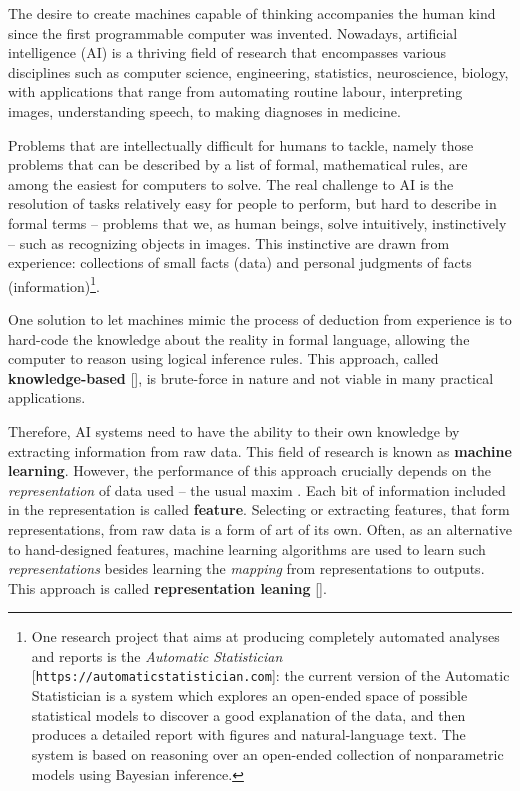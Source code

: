 \pagestyle{fancy}


The desire to create machines capable of thinking accompanies the human kind since the first programmable computer was invented. Nowadays, artificial intelligence (AI) is a thriving field of research that encompasses various disciplines such as computer science, engineering, statistics, neuroscience, biology, with applications that range from automating routine labour, interpreting images, understanding speech, to making diagnoses in medicine.

Problems that are intellectually difficult for humans to tackle, namely those problems that can be described by a list of formal, mathematical rules, are among the easiest for computers to solve. The real challenge to AI is the resolution of tasks relatively easy for people to perform, but hard to describe in formal terms -- problems that we, as human beings, solve intuitively, instinctively -- such as recognizing objects in images. This instinctive  are drawn from experience: collections of small facts (data) and personal judgments of facts (information)\footnote{One research project that aims at producing completely automated analyses and reports is the \textit{Automatic Statistician} [\texttt{https://automaticstatistician.com}]: the current version of the Automatic Statistician is a system which explores an open-ended space of possible statistical models to discover a good explanation of the data, and then produces a detailed report with figures and natural-language text. The system is based on reasoning over an open-ended collection of nonparametric models using Bayesian inference.}.

One solution to let machines mimic the process of deduction from experience is to hard-code the knowledge about the reality in formal language, allowing the computer to reason using logical inference rules. This approach, called \textbf{knowledge-based} [\cite{Goodfellow-et-al-2016}], is brute-force in nature and not viable in many practical applications.

Therefore, AI systems need to have the ability to  their own knowledge by extracting information from raw data. This field of research is known as \textbf{machine learning}. However, the performance of this approach crucially depends on the \textit{representation} of data used -- the usual maxim . Each bit of information included in the representation is called \textbf{feature}. Selecting or extracting features, that form representations, from raw data is a form of art of its own. Often, as an alternative to hand-designed features, machine learning algorithms are used to learn such \textit{representations} besides learning the \textit{mapping} from representations to outputs. This approach is called \textbf{representation leaning} [\cite{Goodfellow-et-al-2016}]. 

